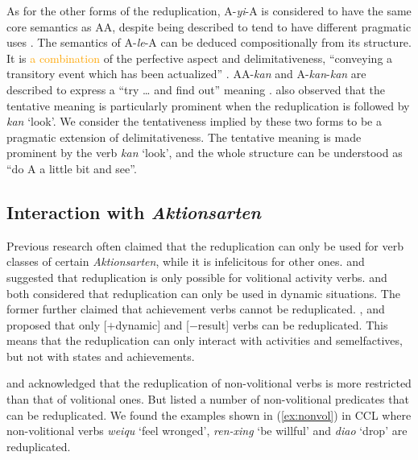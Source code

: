 \documentclass[11pt,a4paper,fleqn,draft]{article}
\newcommand{\changed}[1]{\textcolor{orange}{#1}}
\begin{document}
As for the other forms of the reduplication, 
A-\emph{yi}-A is considered to have the same core semantics as AA,
despite being described to tend to have different pragmatic uses \citep{Yang2003}. 
The semantics of A-\emph{le}-A can be deduced compositionally from its structure. 
It is \changed{a combination} of the perfective aspect and delimitativeness, ``conveying a transitory event which has been actualized'' \citep[151]{XiaoMcEnery2004}.
AA-\emph{kan} and A-\emph{kan}-\emph{kan} are described to express a ``try \ldots{} and find out'' meaning \citep[63]{Cheng2012}.
\citet[290]{Tsao2001} also observed that the tentative meaning is particularly prominent when the reduplication is followed by \emph{kan} `look'.
We consider the tentativeness implied by these two forms to be a pragmatic extension of delimitativeness.
The tentative meaning is made prominent by the verb \emph{kan} `look',
and the whole structure can be understood as ``do A a little bit and see''.




\subsection{Interaction with \emph{Aktionsarten}}\label{sec:Aktionsarten}

Previous research often claimed that the reduplication can only be used for verb classes of certain \emph{Aktionsarten}, while it is infelicitous for other ones.
\citet[277--278]{Hong1999} and \citet[234--235]{LiThompson1981} suggested that reduplication is only possible for volitional activity verbs.
\citet[70--71]{Dai1997} and \citet[290]{Tsao2001} both considered that reduplication can only be used in dynamic situations.
The former further claimed that achievement verbs cannot be reduplicated.
\citet[20]{Arcodiaetal2014}, \citet{BascianoMelloni2017} and \citet[155]{XiaoMcEnery2004} proposed that only [$+$dynamic] and [$-$result] verbs can be reduplicated.
This means that the reduplication can only interact with activities and semelfactives, but not with states and achievements.

\citet[53]{Chen2001} and \citet[10--11]{Yang2003} acknowledged that the reduplication of non\hyp{}volitional verbs is more restricted than that of volitional ones.
But \citet[381--382]{Zhu1998} listed a number of non\hyp{}volitional predicates that can be reduplicated.
We found the examples shown in (\ref{ex:nonvol}) in CCL where non\hyp{}volitional verbs \emph{weiqu} `feel wronged', \emph{ren-xing} `be willful' and \emph{diao} `drop' are reduplicated.
\end{document}
